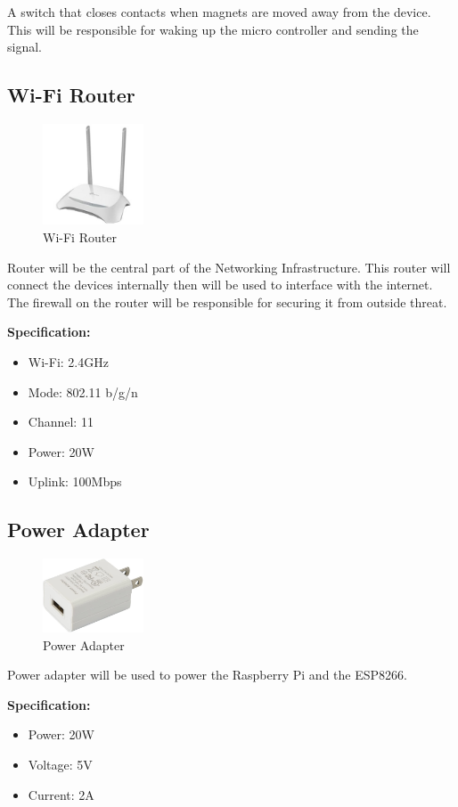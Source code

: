         \begin{flushleft}
            A switch that closes contacts when magnets are moved away from the device. This will be responsible for waking up the micro controller 
            and sending the signal.
        \end{flushleft}

   \subsection{Wi-Fi Router}
   \begin{figure}[H]
       \centering
       \includegraphics[width=3cm]{images/router.jpg}
       \caption{Wi-Fi Router}
   \end{figure}

   \begin{flushleft}
       Router will be the central part of the Networking Infrastructure. This router will connect the devices internally then will be used 
       to interface with the internet. The firewall on the router will be responsible for securing it from outside threat. 
   \end{flushleft}
   \textbf{Specification:}
   \begin{itemize}
       \item Wi-Fi: 2.4GHz
       \item Mode: 802.11 b/g/n
       \item Channel: 11
       \item Power: 20W
       \item Uplink: 100Mbps
   \end{itemize}

    \subsection{Power Adapter}
        \begin{figure}[H]
            \centering
            \includegraphics[width=3cm]{images/adapter.jpg}
            \caption{Power Adapter}
        \end{figure}
        \begin{flushleft}
            Power adapter will be used to power the Raspberry Pi and the ESP8266.
        \end{flushleft}
        \textbf{Specification:}
        \begin{itemize}
            \item Power: 20W
            \item Voltage: 5V
            \item Current: 2A
        \end{itemize}
        
